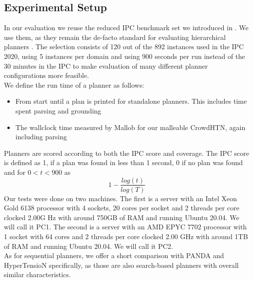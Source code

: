 \subsection{Experimental Setup}
\label{eval: setup}
In our evaluation we reuse the reduced IPC benchmark set we introduced in \cite{bretl2021parallel}.
We use them, as they remain the de-facto standard for evaluating hierarchical planners \cite{schreiber2021lilotane, holler2020htn, holler2021landmark, bretl2021parallel}.
The selection consists of 120 out of the 892 instances used in the IPC 2020, using 5 instances per domain and using 900 seconds per run instead of the 30 minutes in the IPC to make evaluation of many different planner configurations more feasible. \\
We define the run time of a planner as follows:
\begin{itemize}
	\item From start until a plan is printed for standalone planners. This includes time spent parsing and grounding
	\item The wallclock time measured by Mallob for our malleable CrowdHTN, again including parsing
\end{itemize}
Planners are scored according to both the IPC score and coverage. The IPC score is defined as 1, if a plan was found in less than 1 second, 0 if no plan was found and for $0 < t < 900$ as
\[
1 - \frac{log(t)}{log(T)}
\]
Our tests were done on two machines. The first is a server with an Intel Xeon Gold 6138 processor with 4 sockets, 20 cores per socket and 2 threads per core clocked 2.00G Hz with around 750GB of RAM and running Ubuntu 20.04. We will call it PC1. The second is a server with an AMD EPYC 7702 processor with 1 socket with 64 cores and 2 threads per core clocked 2.00 GHz with around 1TB of RAM and running Ubuntu 20.04. We will call it PC2. \\
As for sequential planners, we offer a short comparison with PANDA and HyperTensioN specifically, as those are also search-based planners with overall similar characteristics. 

